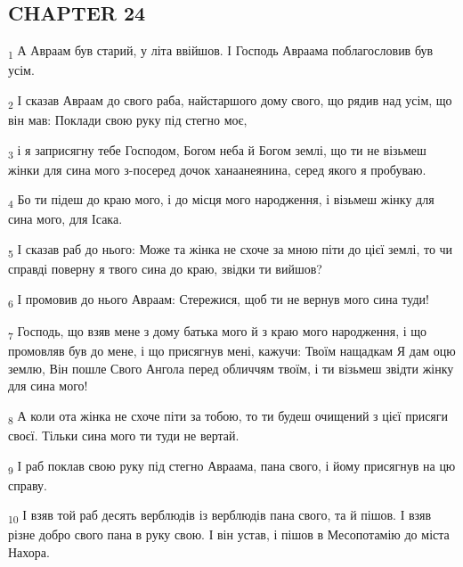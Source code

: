 \subsection{CHAPTER 24}
\begin{tcolorbox}
\textsubscript{1} А Авраам був старий, у літа ввійшов. І Господь Авраама поблагословив був усім.
\end{tcolorbox}
\begin{tcolorbox}
\textsubscript{2} І сказав Авраам до свого раба, найстаршого дому свого, що рядив над усім, що він мав: Поклади свою руку під стегно моє,
\end{tcolorbox}
\begin{tcolorbox}
\textsubscript{3} і я заприсягну тебе Господом, Богом неба й Богом землі, що ти не візьмеш жінки для сина мого з-посеред дочок ханаанеянина, серед якого я пробуваю.
\end{tcolorbox}
\begin{tcolorbox}
\textsubscript{4} Бо ти підеш до краю мого, і до місця мого народження, і візьмеш жінку для сина мого, для Ісака.
\end{tcolorbox}
\begin{tcolorbox}
\textsubscript{5} І сказав раб до нього: Може та жінка не схоче за мною піти до цієї землі, то чи справді поверну я твого сина до краю, звідки ти вийшов?
\end{tcolorbox}
\begin{tcolorbox}
\textsubscript{6} І промовив до нього Авраам: Стережися, щоб ти не вернув мого сина туди!
\end{tcolorbox}
\begin{tcolorbox}
\textsubscript{7} Господь, що взяв мене з дому батька мого й з краю мого народження, і що промовляв був до мене, і що присягнув мені, кажучи: Твоїм нащадкам Я дам оцю землю, Він пошле Свого Ангола перед обличчям твоїм, і ти візьмеш звідти жінку для сина мого!
\end{tcolorbox}
\begin{tcolorbox}
\textsubscript{8} А коли ота жінка не схоче піти за тобою, то ти будеш очищений з цієї присяги своєї. Тільки сина мого ти туди не вертай.
\end{tcolorbox}
\begin{tcolorbox}
\textsubscript{9} І раб поклав свою руку під стегно Авраама, пана свого, і йому присягнув на цю справу.
\end{tcolorbox}
\begin{tcolorbox}
\textsubscript{10} І взяв той раб десять верблюдів із верблюдів пана свого, та й пішов. І взяв різне добро свого пана в руку свою. І він устав, і пішов в Месопотамію до міста Нахора.
\end{tcolorbox}

